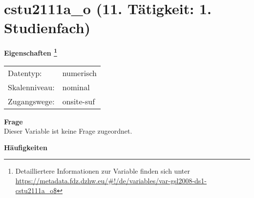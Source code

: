 
    \setcounter{footnote}{0}

    \vspace*{-1.8cm}
	\section{cstu2111a\_o (11. Tätigkeit: 1. Studienfach)}
	\label{section:cstu2111a_o}



    \vspace*{0.5cm}
    \noindent\textbf{Eigenschaften
	\footnote{Detailliertere Informationen zur Variable finden sich unter
		\url{https://metadata.fdz.dzhw.eu/\#!/de/variables/var-gsl2008-ds1-cstu2111a_o$}}}\\
	\begin{tabularx}{\hsize}{@{}lX}
	Datentyp: & numerisch \\
	Skalenniveau: & nominal \\
	Zugangswege: &
	  onsite-suf
 \\
    \end{tabularx}



		\vspace*{0.5cm}
		\noindent\textbf{Frage}\\
		Dieser Variable ist keine Frage zugeordnet.





        		\vspace*{0.5cm}
                \noindent\textbf{Häufigkeiten}

